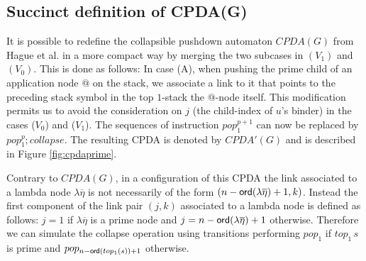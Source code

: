 \documentclass[a4paper]{article}
\theoremstyle{remark}
\theoremstyle{definition}
\begin{document}
\subsection{Succinct definition of CPDA(G)}
It is possible to redefine the collapsible pushdown automaton $CPDA(G)$ from Hague et al.
\cite{hmos-lics08} in a more compact way by merging the two subcases in
$(V_1)$ and $(V_0)$. This is done as follows: In case (A), when
pushing the prime child of an application node $@$ on the stack, we
associate a link to it that points to the preceding stack symbol in
the top $1$-stack \ie the $@$-node itself.
 This modification permits us to avoid the consideration on $j$ (the child-index of $u$'s binder) in the
 cases ($V_0$) and ($V_1$). The sequences of instruction $pop_1^{p+1}$ can now be replaced by
 $pop_1^p ; collapse$. The resulting CPDA is denoted by $CPDA'(G)$ and is described in
Figure \ref{fig:cpdaprime}.
\begin{figure}
\begin{center}
\end{center}
\end{figure}
Contrary to $CPDA(G)$, in a configuration of this CPDA the link associated to a lambda node $\lambda\overline\eta$ is not necessarily of the form
$(n-{\sf ord}(\lambda\overline\eta)+1,k)$. Instead the first component of the link pair $(j,k)$ associated to a lambda node is defined as follows:
$j = 1$ if $\lambda\overline\eta$ is a prime node and $j=n-{\sf ord}(\lambda\overline\eta)+1$ otherwise. Therefore we can simulate the collapse operation
using transitions performing $pop_1$ if $top_1\, s$ is prime and $pop_{n-{\sf ord}(top_1(s))+1}$ otherwise.
\end{document}
